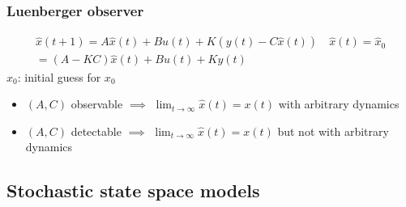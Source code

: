 \documentclass{book}
\begin{document}
\subsubsection{Luenberger observer}
\begin{gather*}
    \hat{x}(t+1)=A\hat{x}(t)+Bu(t)+K(y(t)-C\hat{x}(t)) \quad \hat{x}(t)=\hat{x}_0\\
    =(A-KC)\hat{x}(t)+Bu(t)+Ky(t)
\end{gather*}
$\hat{x}_0$: initial guess for $x_0$
\begin{itemize}
    \item $(A,C)$ observable $\implies$ $\lim_{t\to\infty}\hat{x}(t)=x(t)$ with arbitrary dynamics
    \item $(A,C)$ detectable $\implies$ $\lim_{t\to\infty}\hat{x}(t)=x(t)$ but not with arbitrary dynamics
\end{itemize}

\subsection{Stochastic state space models}
\end{document}
